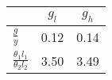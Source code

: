 \begin{tiny}\begin{tabular}{|l|c|c|}
\hline
&\textbf{$g_l$}&\textbf{$g_h$}\\\hline
\textbf{$\frac{g}{y}$}&0.12&0.14\\\hline
\textbf{$\frac{\theta_1 l_1}{\theta_2 l_2}$}&3.50&3.49\\\hline
\end{tabular}
\end{tiny}